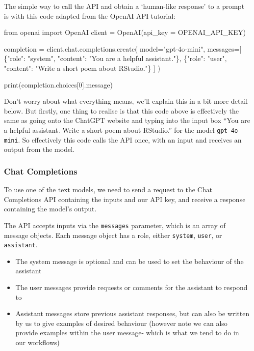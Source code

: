 \documentclass[
  letterpaper,
  DIV=11,
  numbers=noendperiod]{scrreprt}
\newenvironment{Shaded}{\begin{snugshade}}{\end{snugshade}}
\newcommand{\AttributeTok}[1]{\textcolor[rgb]{0.40,0.45,0.13}{#1}}
\newcommand{\DecValTok}[1]{\textcolor[rgb]{0.68,0.00,0.00}{#1}}
\newcommand{\FunctionTok}[1]{\textcolor[rgb]{0.28,0.35,0.67}{#1}}
\newcommand{\NormalTok}[1]{\textcolor[rgb]{0.00,0.23,0.31}{#1}}
\newcommand{\OtherTok}[1]{\textcolor[rgb]{0.00,0.23,0.31}{#1}}
\newcommand{\SpecialCharTok}[1]{\textcolor[rgb]{0.37,0.37,0.37}{#1}}
\newcommand{\StringTok}[1]{\textcolor[rgb]{0.13,0.47,0.30}{#1}}
\providecommand{\tightlist}{%
  \setlength{\itemsep}{0pt}\setlength{\parskip}{0pt}}\usepackage{longtable,booktabs,array}
\begin{document}
The simple way to call the API and obtain a `human-like response' to a
prompt is with this code adapted from the OpenAI API tutorial:

\begin{Shaded}
\begin{Highlighting}[]
\NormalTok{from openai import OpenAI}
\NormalTok{client }\OtherTok{=} \FunctionTok{OpenAI}\NormalTok{(}\AttributeTok{api\_key =}\NormalTok{ OPENAI\_API\_KEY)}

\NormalTok{completion }\OtherTok{=} \FunctionTok{client.chat.completions.create}\NormalTok{(}
    \AttributeTok{model=}\StringTok{"gpt{-}4o{-}mini"}\NormalTok{,}
    \AttributeTok{messages=}\NormalTok{[}
\NormalTok{        \{}\StringTok{"role"}\SpecialCharTok{:} \StringTok{"system"}\NormalTok{, }\StringTok{"content"}\SpecialCharTok{:} \StringTok{"You are a helpful assistant."}\NormalTok{\},}
\NormalTok{        \{}\StringTok{"role"}\SpecialCharTok{:} \StringTok{"user"}\NormalTok{, }\StringTok{"content"}\SpecialCharTok{:} \StringTok{"Write a short poem about RStudio."}\NormalTok{\}}
\NormalTok{    ]}
\NormalTok{)}

\FunctionTok{print}\NormalTok{(completion.choices[}\DecValTok{0}\NormalTok{].message)}
\end{Highlighting}
\end{Shaded}

Don't worry about what everything means, we'll explain this in a bit
more detail below. But firstly, one thing to realise is that this code
above is effectively the same as going onto the ChatGPT website and
typing into the input box ``You are a helpful assistant. Write a short
poem about RStudio.'' for the model \texttt{gpt-4o-mini}. So effectively
this code calls the API once, with an input and receives an output from
the model.

\subsubsection{Chat Completions}\label{chat-completions}

To use one of the text models, we need to send a request to the Chat
Completions API containing the inputs and our API key, and receive a
response containing the model's output.

The API accepts inputs via the \texttt{messages} parameter, which is an
array of message objects. Each message object has a role, either
\texttt{system}, \texttt{user}, or \texttt{assistant}.

\begin{itemize}
\tightlist
\item
  The system message is optional and can be used to set the behaviour of
  the assistant
\item
  The user messages provide requests or comments for the assistant to
  respond to
\item
  Assistant messages store previous assistant responses, but can also be
  written by us to give examples of desired behaviour (however note we
  can also provide examples within the user message- which is what we
  tend to do in our workflows)
\end{itemize}
\end{document}
